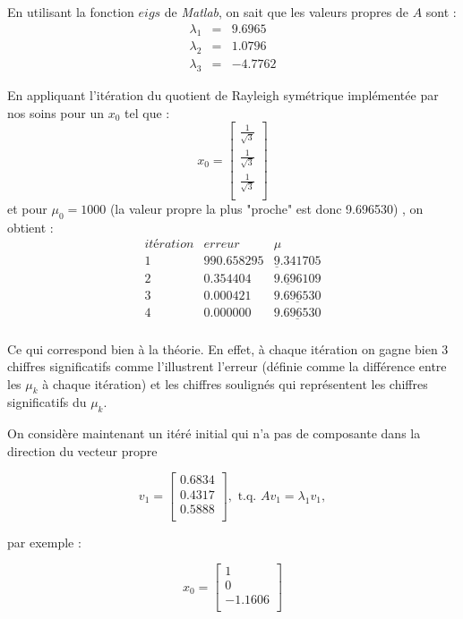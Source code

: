 En utilisant la fonction $eigs$ de \textit{Matlab}, on sait que les valeurs propres de $A$ sont : 
   \begin{eqnarray} \label{valPropre1}
   \lambda_1 &=& 9.6965\\\label{valPropre2}
   \lambda_2 &=& 1.0796 \\\label{valPropre3}
   \lambda_3 &=& -4.7762
   \end{eqnarray}

En appliquant l'itération du quotient de Rayleigh symétrique implémentée par nos soins pour un $x_0$ tel que : 
$$ x_0 = \left[
\begin{array}{c}
  \frac{1}{\sqrt{3}}  \\
  \frac{1}{\sqrt{3}} \\
  \frac{1}{\sqrt{3}} \\
\end{array}
\right]$$
 et pour $\mu_0 = 1000$ (la valeur propre la plus "proche" est donc 9.696530) , on obtient : 
$$\begin{array}{ccc}
  itération & erreur & \mu  \\
  1 &  990.658295   & \underline{9}.341705  \\
  2 &   0.354404   &  \underline{9.696}109\\
  3 &  0.000421  & \underline{9.696530} \\
  4 &  0.000000  & \underline{9.696530} \\
\end{array}$$

Ce qui correspond bien à la théorie. En effet, à chaque itération on gagne bien 3 chiffres significatifs comme l'illustrent l'erreur (définie comme la différence entre les $\mu_k$ à chaque itération) et les chiffres soulignés qui représentent les chiffres significatifs du $\mu_k$.

On considère maintenant un itéré initial qui n'a pas de composante dans la direction du vecteur propre  

$$ v_1 = \left[
\begin{array}{c}
  0.6834  \\
   0.4317 \\
   0.5888 \\
\end{array}
\right], \text{ t.q. } Av_1 = \lambda_1 v_1,$$

par exemple  :

$$ x_0 = \left[
\begin{array}{c}
  1  \\
  0 \\
  -1.1606\\
\end{array}
\right]$$

